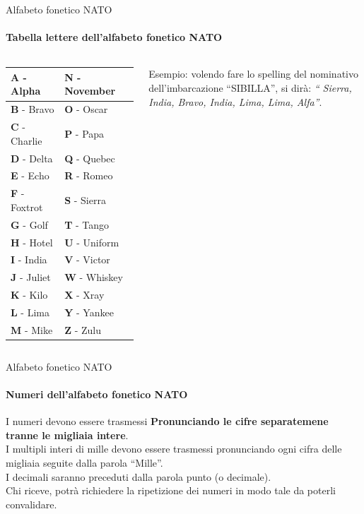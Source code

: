 \documentclass[aspectratio=169]{beamer}
\begin{document}
\begin{frame}{Alfabeto fonetico NATO}
	\framesubtitle{Tabella lettere dell'alfabeto fonetico NATO}
	
		\begin{columns}
			\hfill
			\begin{tabular}{|l|l|}
			\hline
			\textbf{A} - Alpha & \textbf{N} - November \\ \hline
			\textbf{B} - Bravo & \textbf{O} - Oscar \\ \hline
			\textbf{C} - Charlie & \textbf{P} - Papa \\ \hline
			\textbf{D} - Delta & \textbf{Q} - Quebec \\ \hline
			\textbf{E} - Echo & \textbf{R} - Romeo \\ \hline
			\textbf{F} - Foxtrot & \textbf{S} - Sierra \\ \hline
			\textbf{G} - Golf & \textbf{T} - Tango \\ \hline
			\textbf{H} - Hotel & \textbf{U} - Uniform \\ \hline
			\textbf{I} - India & \textbf{V} - Victor \\ \hline
			\textbf{J} - Juliet & \textbf{W} - Whiskey \\ \hline
			\textbf{K} - Kilo & \textbf{X} - Xray \\ \hline
			\textbf{L} - Lima & \textbf{Y} - Yankee \\ \hline
			\textbf{M} - Mike & \textbf{Z} - Zulu \\ \hline
		\end{tabular}
		Esempio: volendo fare lo spelling del nominativo dell'imbarcazione “SIBILLA”, si dirà: \emph{“ Sierra, India, Bravo, India, Lima, Lima, Alfa”}.
	\end{columns}
\end{frame}

\begin{frame}{Alfabeto fonetico NATO}
	\framesubtitle{Numeri dell'alfabeto fonetico NATO}
	I numeri devono essere trasmessi \textbf{Pronunciando le cifre separatemene tranne le migliaia intere}.\\
	I multipli interi di mille devono essere trasmessi pronunciando ogni cifra delle migliaia seguite dalla parola “Mille”.\\
	I decimali saranno preceduti dalla parola punto (o decimale).\\
	\smallskip
	Chi riceve, potrà richiedere la ripetizione dei numeri in modo tale da poterli convalidare.\\
\end{frame}
\end{document}
